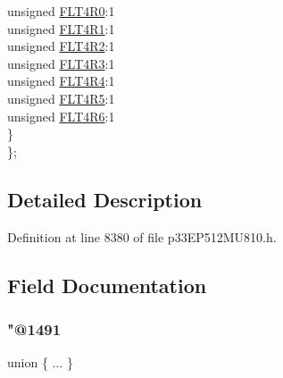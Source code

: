 \begin{DoxyCompactItemize}
\begin{tabbing}
\>\>unsigned \hyperlink{structtag_r_p_i_n_r13_b_i_t_s_ace93cd3367a6d5079c544ae3d0eb70b6}{FLT4R0}:1\\
\>\>unsigned \hyperlink{structtag_r_p_i_n_r13_b_i_t_s_ad86b43476f93ef5b81820707e4824253}{FLT4R1}:1\\
\>\>unsigned \hyperlink{structtag_r_p_i_n_r13_b_i_t_s_a230daf39ce613a405827988598780494}{FLT4R2}:1\\
\>\>unsigned \hyperlink{structtag_r_p_i_n_r13_b_i_t_s_a2cbadd8a8704e8bd86322963f38ad8ab}{FLT4R3}:1\\
\>\>unsigned \hyperlink{structtag_r_p_i_n_r13_b_i_t_s_ae72aa8eec3910efa0a36d9bc0a2d9eb8}{FLT4R4}:1\\
\>\>unsigned \hyperlink{structtag_r_p_i_n_r13_b_i_t_s_a80a46acfe2b4fdf5a7dae59c09cbffde}{FLT4R5}:1\\
\>\>unsigned \hyperlink{structtag_r_p_i_n_r13_b_i_t_s_a3064b9ed910683ec4d1c23f24f47777d}{FLT4R6}:1\\
\>\} \\
\}; \\

\end{tabbing}\end{DoxyCompactItemize}


\subsection{Detailed Description}


Definition at line 8380 of file p33\+E\+P512\+M\+U810.\+h.



\subsection{Field Documentation}
\mbox{\label{structtag_r_p_i_n_r13_b_i_t_s_ae1f866ea23f5031f27dfefc963fbb26b}} 
\subsubsection{\texorpdfstring{"@1491}{@1491}}
{\footnotesize\ttfamily union \{ ... \} }

\mbox{\label{structtag_r_p_i_n_r13_b_i_t_s_adf71f3d8410c1f1dbbc96680a92c49af}} 
